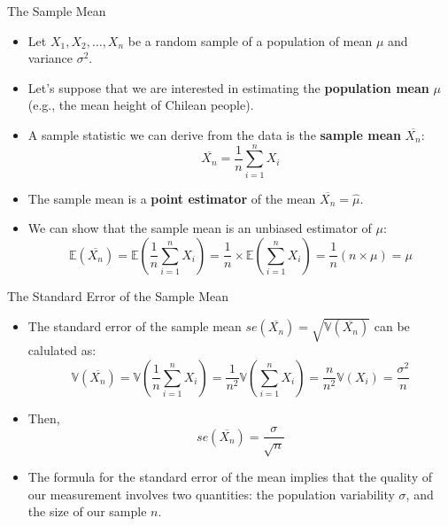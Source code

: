 \documentclass[handout]{beamer}
\begin{document}
\begin{frame}{The Sample Mean}
\scriptsize{

\begin{itemize}
 \item Let $X_1,X_2,\dots,X_n$ be a random sample of a population of mean $\mu$ and variance $\sigma^2$.
 \item Let's suppose that we are interested in estimating the \textbf{population mean} $\mu$ (e.g., the mean height of Chilean people).
 \item  A sample statistic we can derive from the data is the  \textbf{sample mean} $\overline{X_{n}}$:
 \begin{displaymath}
  \overline{X_{n}}=\frac{1}{n}\sum_{i=1}^{n} X_i
 \end{displaymath}
 \item The sample mean is a \textbf{point estimator} of the mean $\overline{X_{n}} = \hat{\mu}$.

\item We can show that the sample mean is an unbiased estimator of $\mu$:
\begin{displaymath}
\mathbb{E}(\overline{X_{n}}) = \mathbb{E}(\frac 1n \sum_{i=1}^{n} X_i)  =  \frac 1n \times \mathbb{E}(\sum_{i=1}^{n} X_i) = \frac 1n (n \times \mu) = \mu  
\end{displaymath}
\end{itemize}

} 
\end{frame}

\begin{frame}{The Standard Error of the Sample Mean}
\scriptsize{

\begin{itemize}
\item The standard error of the sample mean $se(\overline{X_{n}}) = \sqrt{\mathbb{V}(\overline{X_{n}})}$ can be calulated as:
\begin{displaymath}
 \mathbb{V}(\overline{X_{n}})=\mathbb{V}(\frac 1n \sum_{i=1}^{n} X_i) = \frac{1}{n^2} \mathbb{V}(\sum_{i=1}^{n} X_i) = \frac{n}{n^2} \mathbb{V}(X_i)=\frac{\sigma^2}{n} 
\end{displaymath}

\item Then,
\begin{displaymath}
 se(\overline{X_{n}}) = \frac{\sigma}{\sqrt{n}}
\end{displaymath}





\item The formula for the standard error of the mean implies that the quality of our measurement involves two quantities: the population variability $\sigma$, and the size of our sample $n$.

\end{itemize}


} 
\end{frame}
\end{document}
